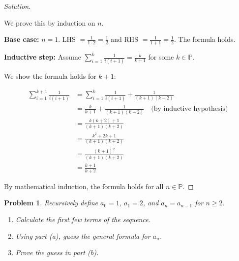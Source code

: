 \documentclass[12pt]{article}
\newtheorem{problem}{Problem}
\newcommand{\PP}{\ensuremath{\mathbb{P}}}
\begin{document}
\begin{proof}[Solution]
~

We prove this by induction on $n$.

\textbf{Base case:} $n = 1$. LHS $= \frac{1}{1 \cdot 2} = \frac{1}{2}$ and RHS $= \frac{1}{1+1} = \frac{1}{2}$. The formula holds.

\textbf{Inductive step:} Assume $\sum_{i=1}^{k} \frac{1}{i(i+1)} = \frac{k}{k+1}$ for some $k \in \PP$.

We show the formula holds for $k+1$:

\begin{align*}
\sum_{i=1}^{k+1} \frac{1}{i(i+1)} &= \sum_{i=1}^{k} \frac{1}{i(i+1)} + \frac{1}{(k+1)(k+2)} \\
&= \frac{k}{k+1} + \frac{1}{(k+1)(k+2)} \quad \text{(by inductive hypothesis)} \\
&= \frac{k(k+2) + 1}{(k+1)(k+2)} \\
&= \frac{k^2 + 2k + 1}{(k+1)(k+2)} \\
&= \frac{(k+1)^2}{(k+1)(k+2)} \\
&= \frac{k+1}{k+2}
\end{align*}

By mathematical induction, the formula holds for all $n \in \PP$.
\end{proof}

\newpage

\setcounter{problem}{5}
\begin{problem}
Recursively define $a_0 = 1$, $a_1 = 2$, and $a_n = a_{n-1}$ for $n \geq 2$.

\begin{enumerate}[label=(\alph*)]
    \item Calculate the first few terms of the sequence.
    
    \item Using part (a), guess the general formula for $a_n$.
    
    \item Prove the guess in part (b).
\end{enumerate}
\end{problem}
\end{document}
